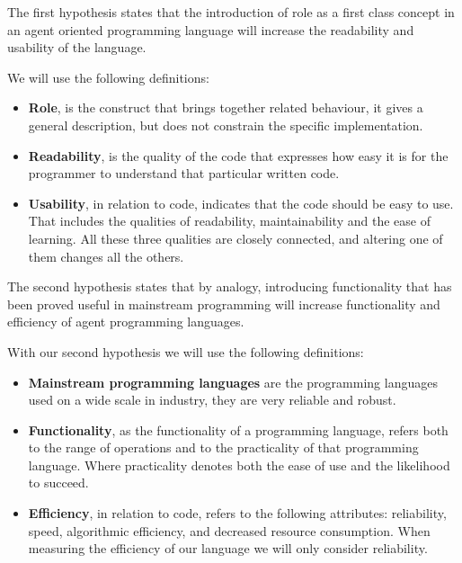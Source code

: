 \documentclass[a4paper,12pt,oneside,fleqn]{book} %
\begin{document}

The first hypothesis states that the introduction of role as a first class
concept in an agent oriented programming language will increase the
readability and usability of the language.

We will use the following definitions:
\begin{itemize}
  \item \textbf{Role}, is the construct that brings together related behaviour, 
     it gives a general description, but does not constrain the specific
     implementation.
   \item \textbf{Readability}, is the quality of the code that expresses how 
     easy it is for the programmer to understand that particular written code.
   \item \textbf{Usability}, in relation to code, indicates that the code 
     should be easy to use. That includes the qualities of readability,
     maintainability and the ease of learning. All these three qualities
     are closely connected, and altering one of them changes all the
     others.
\end{itemize}

The second hypothesis states that by analogy, introducing functionality
that has been proved useful in mainstream programming will increase
functionality and efficiency of agent programming languages.

With our second hypothesis we will use the following definitions:
\begin{itemize}
  \item \textbf{Mainstream programming languages} are the programming languages
     used on a wide scale in industry, they are very reliable and robust.
   \item \textbf{Functionality}, as the functionality of a programming language,
     refers both to the range of operations and to the practicality of
     that programming language. Where practicality denotes both the ease of
     use and the likelihood to succeed.
   \item \textbf{Efficiency}, in relation to code, refers to the following
     attributes: reliability, speed, algorithmic efficiency, and decreased
     resource consumption. When measuring the efficiency of our language we
     will only consider reliability.
\end{itemize}
\end{document}
